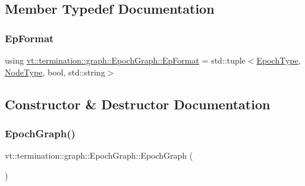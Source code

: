 \subsection{Member Typedef Documentation}
\mbox{\label{structvt_1_1termination_1_1graph_1_1_epoch_graph_a127b9f54d98b9645451c2d9a2821d10e}} 
\subsubsection{\texorpdfstring{Ep\+Format}{EpFormat}}
{\footnotesize\ttfamily using \hyperlink{structvt_1_1termination_1_1graph_1_1_epoch_graph_a127b9f54d98b9645451c2d9a2821d10e}{vt\+::termination\+::graph\+::\+Epoch\+Graph\+::\+Ep\+Format} =  std\+::tuple$<$\hyperlink{namespacevt_a985a5adf291c34a3ca263b3378388236}{Epoch\+Type}, \hyperlink{namespacevt_a866da9d0efc19c0a1ce79e9e492f47e2}{Node\+Type}, bool, std\+::string$>$}



\subsection{Constructor \& Destructor Documentation}
\mbox{\label{structvt_1_1termination_1_1graph_1_1_epoch_graph_a2ad0e6af761b4ff43605ad9d3f33d709}} 
\subsubsection{\texorpdfstring{Epoch\+Graph()}{EpochGraph()}\hspace{0.1cm}{\footnotesize\ttfamily [1/4]}}
{\footnotesize\ttfamily vt\+::termination\+::graph\+::\+Epoch\+Graph\+::\+Epoch\+Graph (\begin{DoxyParamCaption}{ }\end{DoxyParamCaption})\hspace{0.3cm}{\ttfamily [default]}}


